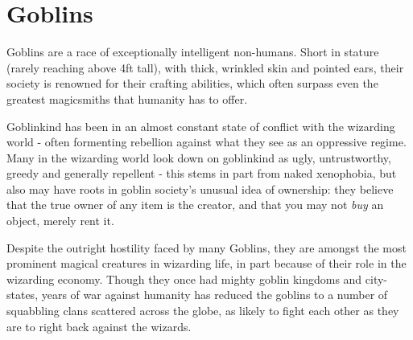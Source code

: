 	
	
	

 
\section{Goblins}

Goblins are a race of exceptionally intelligent non-humans. Short in stature (rarely reaching above 4ft tall), with thick, wrinkled skin and pointed ears, their society is renowned for their crafting abilities, which often surpass even the greatest magicsmiths that humanity has to offer. 

Goblinkind has been in an almost constant state of conflict with the wizarding world - often formenting rebellion against what they see as an oppressive regime. Many in the wizarding world look down on goblinkind as ugly, untrustworthy, greedy and generally repellent - this stems in part from naked xenophobia, but also may have roots in goblin society's unusual idea of ownership: they believe that the true owner of any item is the creator, and that you may not {\it buy} an object, merely rent it. 

Despite the outright hostility faced by many Goblins, they are amongst the most prominent magical creatures in wizarding life, in part because of their role in the wizarding economy. Though they once had mighty goblin kingdoms and city-states, years of war against humanity has reduced the goblins to a number of squabbling clans scattered across the globe, as likely to fight each other as they are to right back against the wizards. 
	
